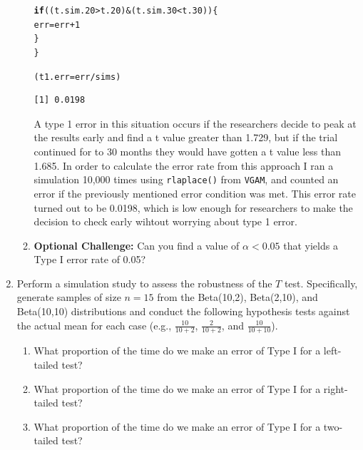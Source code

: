 \documentclass{article}\usepackage[]{graphicx}\usepackage[]{xcolor}
\makeatletter
\newcommand{\hlnum}[1]{\textcolor[rgb]{0.686,0.059,0.569}{#1}}%
\newcommand{\hlopt}[1]{\textcolor[rgb]{0,0,0}{#1}}%
\newcommand{\hldef}[1]{\textcolor[rgb]{0.345,0.345,0.345}{#1}}%
\newcommand{\hlkwa}[1]{\textcolor[rgb]{0.161,0.373,0.58}{\textbf{#1}}}%
\newcommand{\hlkwb}[1]{\textcolor[rgb]{0.69,0.353,0.396}{#1}}%
\newenvironment{kframe}{%
 \def\at@end@of@kframe{}%
 \ifinner\ifhmode%
  \def\at@end@of@kframe{\end{minipage}}%
  \begin{minipage}{\columnwidth}%
 \fi\fi%
 \def\FrameCommand##1{\hskip\@totalleftmargin \hskip-\fboxsep
 \colorbox{shadecolor}{##1}\hskip-\fboxsep
     \hskip-\linewidth \hskip-\@totalleftmargin \hskip\columnwidth}%
 \MakeFramed {\advance\hsize-\width
   \@totalleftmargin\z@ \linewidth\hsize
   \@setminipage}}%
 {\par\unskip\endMakeFramed%
 \at@end@of@kframe}
\newenvironment{knitrout}{}{} %
\makeatother
\begin{document}
\begin{enumerate}
\begin{enumerate}
\begin{knitrout}
\begin{kframe}
\begin{alltt}
  \hlkwa{if}\hldef{((t.sim.20} \hlopt{>} \hldef{t.20)} \hlopt{&} \hldef{(t.sim.30} \hlopt{<} \hldef{t.30))\{}
    \hldef{err} \hlkwb{=} \hldef{err} \hlopt{+} \hlnum{1}
  \hldef{\}}
\hldef{\}}

\hldef{(t1.err} \hlkwb{=} \hldef{err}\hlopt{/}\hldef{sims)}
\end{alltt}
\begin{verbatim}
[1] 0.0198
\end{verbatim}
\end{kframe}
\end{knitrout}

A type 1 error in this situation occurs if the researchers decide to peak at the results early and find a t value greater than 1.729, but if the trial continued for to 30 months they would have gotten a t value less than 1.685. In order to calculate the error rate from this approach I ran a simulation 10,000 times using \texttt{rlaplace()} from \texttt{VGAM}, and counted an error if the previously mentioned error condition was met. This error rate turned out to be 0.0198, which is low enough for researchers to make the decision to check early wihtout worrying about type 1 error.

  \item \textbf{Optional Challenge:} Can you find a value of $\alpha<0.05$ that yields a 
  Type I error rate of 0.05?
\end{enumerate}
  \item Perform a simulation study to assess the robustness of the $T$ test. 
  Specifically, generate samples of size $n=15$ from the Beta(10,2), Beta(2,10), 
  and Beta(10,10) distributions and conduct the following hypothesis tests against 
  the actual mean for each case (e.g., $\frac{10}{10+2}$, $\frac{2}{10+2}$, and 
  $\frac{10}{10+10}$). 
  \begin{enumerate}
    \item What proportion of the time do we make an error of Type I for a
    left-tailed test?
    \item What proportion of the time do we make an error of Type I for a
    right-tailed test?
    \item What proportion of the time do we make an error of Type I for a
    two-tailed test?
    

\end{enumerate}
\end{enumerate}
\end{document}
